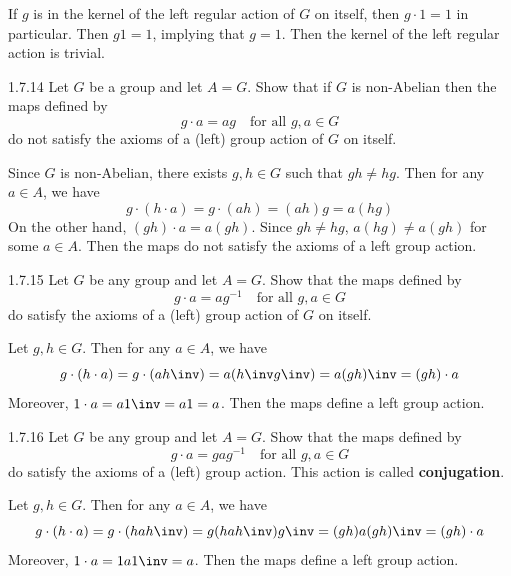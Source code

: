 \begin{sol}
    If $g$ is in the kernel of the left regular action of $G$ on itself, then $g \cdot 1 = 1$ in particular.
	Then $g1 = 1$, implying that $g = 1$.
	Then the kernel of the left regular action is trivial.
\end{sol}

\begin{exercise}{1.7.14}
    Let $G$ be a group and let $A = G$.
	Show that if $G$ is non-Abelian then the maps defined by  
    \[
    	 g \cdot a = ag \quad \text{for all } g,a\in G 
    \]
    do not satisfy the axioms of a (left) group action of $G$ on itself.
\end{exercise}

\begin{sol}
    Since $G$ is non-Abelian, there exists $g, h \in G$ such that $gh \neq hg$.
	Then for any $a \in A$, we have
    \[
    	g \cdot (h \cdot a) = g \cdot (ah) = (ah)g = a(hg) 
    \]
    On the other hand, $(gh) \cdot a = a(gh)$.
	Since $gh \neq hg$, $a(hg) \neq a(gh)$ for some $a \in A$.
	Then the maps do not satisfy the axioms of a left group action.
\end{sol}

\begin{exercise}{1.7.15}
    Let $G$ be any group and let $A = G$.
	Show that the maps defined by  
    \[
    	 g \cdot a = ag^{-1} \quad \text{for all } g,a\in G 
    \]
    do satisfy the axioms of a (left) group action of $G$ on itself.
\end{exercise}

\begin{sol}
    Let $g, h \in G$.
	Then for any $a \in A$, we have
    \[
    	g \cdot (h \cdot a) = g \cdot (ah\inv) = a(h\inv g\inv) = a(gh)\inv = (gh) \cdot a
    \]
    Moreover, $1 \cdot a = a1\inv = a1 = a$.
	Then the maps define a left group action.
\end{sol}

\begin{spex}{1.7.16}
    Let $G$ be any group and let $A = G$.
	Show that the maps defined by  
    \[
    	 g \cdot a = gag^{-1} \quad \text{for all } g,a\in G 
    \]
    do satisfy the axioms of a (left) group action.
	This action is called \textbf{conjugation}.
\end{spex}

\begin{sol}[spsol]
    Let $g, h \in G$.
	Then for any $a \in A$, we have
    \[
    	g \cdot (h \cdot a) = g \cdot (hah\inv) = g(hah\inv)g\inv = (gh)a(gh)\inv = (gh) \cdot a
    \]
    Moreover, $1 \cdot a = 1a1\inv = a$.
	Then the maps define a left group action.
\end{sol}

